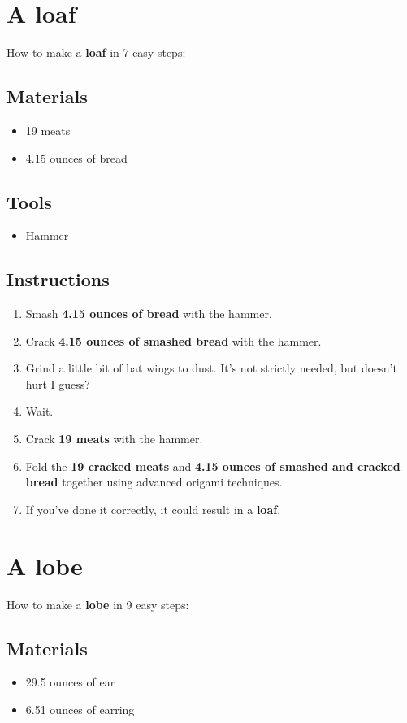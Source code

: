 \documentclass{article}
\begin{document}
\section{A loaf}How to make a \textbf{loaf} in 7 easy steps:

\subsection{Materials}\begin{itemize}
\item 
19 meats
\item 
4.15 ounces of bread
\end{itemize}
\subsection{Tools}\begin{itemize}
\item 
Hammer
\end{itemize}
\subsection{Instructions}\begin{enumerate}
\item 
Smash \textbf{4.15 ounces of bread} with the hammer.
\item 
Crack \textbf{4.15 ounces of smashed bread} with the hammer.
\item 
Grind a little bit of bat wings to dust. It's not strictly needed, but doesn't hurt I guess?
\item 
Wait.
\item 
Crack \textbf{19 meats} with the hammer.
\item 
Fold the \textbf{19 cracked meats} and \textbf{4.15 ounces of smashed and cracked bread} together using advanced origami techniques.
\item 
If you've done it correctly, it could result in a \textbf{loaf}.
\end{enumerate}
\newpage
\section{A lobe}How to make a \textbf{lobe} in 9 easy steps:

\subsection{Materials}\begin{itemize}
\item 
29.5 ounces of ear
\item 
6.51 ounces of earring
\end{itemize}
\end{document}
